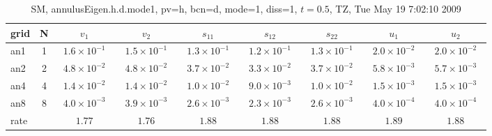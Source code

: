 \begin{table}[hbt]\tableFont %
\begin{center}
\begin{tabular}{|l|c|c|c|c|c|c|c|c|} \hline\hline 
grid  & N  & $v_1$ & $v_2$ & $s_{11}$ & $s_{12}$ & $s_{22}$ & $u_1$ & $u_2$\\ \hline 
                 an1 &     1 & ~$1.6\times10^{ -1}$~ & ~$1.5\times10^{ -1}$~ & ~$1.3\times10^{ -1}$~ & ~$1.2\times10^{ -1}$~ & ~$1.3\times10^{ -1}$~ & ~$2.0\times10^{ -2}$~ & ~$2.0\times10^{ -2}$~  \\ \hline
                 an2 &     2 & ~$4.8\times10^{ -2}$~ & ~$4.8\times10^{ -2}$~ & ~$3.7\times10^{ -2}$~ & ~$3.3\times10^{ -2}$~ & ~$3.7\times10^{ -2}$~ & ~$5.8\times10^{ -3}$~ & ~$5.7\times10^{ -3}$~  \\ \hline
                 an4 &     4 & ~$1.4\times10^{ -2}$~ & ~$1.4\times10^{ -2}$~ & ~$1.0\times10^{ -2}$~ & ~$9.0\times10^{ -3}$~ & ~$1.0\times10^{ -2}$~ & ~$1.5\times10^{ -3}$~ & ~$1.5\times10^{ -3}$~  \\ \hline
                 an8 &     8 & ~$4.0\times10^{ -3}$~ & ~$3.9\times10^{ -3}$~ & ~$2.6\times10^{ -3}$~ & ~$2.3\times10^{ -3}$~ & ~$2.6\times10^{ -3}$~ & ~$4.0\times10^{ -4}$~ & ~$4.0\times10^{ -4}$~  \\ \hline
    rate             &       &       $1.77$          &       $1.76$          &       $1.88$          &       $1.88$          &       $1.88$          &       $1.89$          &       $1.88$           \\ \hline\hline
\end{tabular}
\caption{SM, annulusEigen.h.d.mode1, pv=h, bcn=d, mode=1,  diss=1, $t=0.5$,  TZ, Tue May 19  7:02:10 2009}\label{table:annulusEigen.h.d.mode1}
\end{center}
\end{table}
